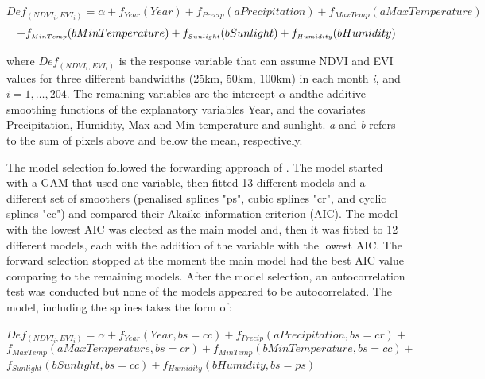 \begin{flushleft}
 \hspace{4em} $Def_{\scriptscriptstyle (NDVI_{i}, EVI_{i})} = \alpha + f_{\scriptscriptstyle Year}(Year) + f_{\scriptscriptstyle Precip}(aPrecipitation) + f_{\scriptscriptstyle Max Temp}(aMax Temperature)$ 
\vspace{-0.2em}
\begin{equation}
  + f_{\scriptscriptstyle Min Temp}(bMin Temperature) +  f_{\scriptscriptstyle Sunlight}(bSunlight) + f_{\scriptscriptstyle Humidity}(bHumidity) \label{eq:10}    
\vspace{-1em}
\end{equation}
\end{flushleft}


where $Def_{\scriptscriptstyle (NDVI_{i}, EVI_{i})}$ is the response variable that can assume NDVI and EVI values for three different bandwidths (25km, 50km, 100km) in each month \textit{i}, and $i=1,\dots,204.$ The remaining variables are the intercept $\alpha$ andthe additive smoothing functions of the explanatory variables Year,  and the covariates Precipitation, Humidity, Max and Min temperature and sunlight. \textit{a} and \textit{b} refers to the sum of pixels above and below the mean, respectively.


The model selection followed the forwarding approach of \citealp[p.391]{zuur_saveliev_ieno_2014}. The model started with a GAM that used one variable, then fitted 13 different models and a different set of smoothers (penalised splines "ps", cubic splines "cr", and cyclic splines "cc") and compared their Akaike information criterion (AIC). The model with the lowest AIC was elected as the main model and, then it was fitted to 12 different models, each with the addition of the variable with the lowest AIC. The forward selection stopped at the moment the main model had the best AIC value comparing to the remaining models. After the model selection, an autocorrelation test was conducted but none of the models appeared to be autocorrelated. The model, including the splines takes the form of:

\begin{flushleft}
 \hspace{1em} $Def_{\scriptscriptstyle (NDVI_{i}, EVI_{i})} = \alpha + f_{\scriptscriptstyle Year}(Year, bs= cc) + f_{\scriptscriptstyle Precip}(aPrecipitation, bs= cr) +$ 
\begin{equation}
 f_{\scriptscriptstyle Max Temp}(aMax Temperature, bs= cr) + f_{\scriptscriptstyle Min Temp}(bMin Temperature, bs= cc) +  \label{eq:11}    
\end{equation}
 \hspace{1em} $f_{\scriptscriptstyle Sunlight}(bSunlight, bs=cc) + f_{\scriptscriptstyle Humidity}(bHumidity, bs= ps)$
\end{flushleft}


